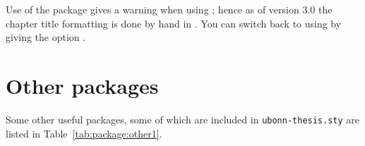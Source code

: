 Use of the  package gives a warning when using \KOMAScript{}; hence
as of version 3.0 the chapter title formatting is done by hand in .
You can switch back to using  by giving the option .


\section{Other packages}
\label{sec:package:other}

Some other useful packages, some of which are included in
\texttt{ubonn-thesis.sty} are listed in
Table~\ref{tab:package:other1}.

